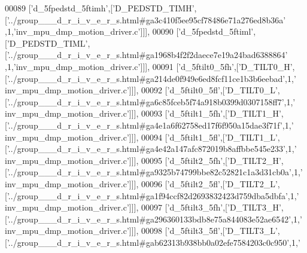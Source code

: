 \begin{DoxyCode}
00089   [\textcolor{stringliteral}{'d\_5fpedstd\_5ftimh'},[\textcolor{stringliteral}{'D\_PEDSTD\_TIMH'},[\textcolor{stringliteral}{'../group\_\_\_d\_r\_i\_v\_e\_r\_s.html#ga3c410f5ee95cf78486e71a276ed8b36a'}
      ,1,\textcolor{stringliteral}{'inv\_mpu\_dmp\_motion\_driver.c'}]]],
00090   [\textcolor{stringliteral}{'d\_5fpedstd\_5ftiml'},[\textcolor{stringliteral}{'D\_PEDSTD\_TIML'},[\textcolor{stringliteral}{'../group\_\_\_d\_r\_i\_v\_e\_r\_s.html#ga1968b4f2f2daece7e19a24bad6388864'}
      ,1,\textcolor{stringliteral}{'inv\_mpu\_dmp\_motion\_driver.c'}]]],
00091   [\textcolor{stringliteral}{'d\_5ftilt0\_5fh'},[\textcolor{stringliteral}{'D\_TILT0\_H'},[\textcolor{stringliteral}{'../group\_\_\_d\_r\_i\_v\_e\_r\_s.html#ga214de0f949e6ed8fcf11ce1b3b6eebad'},1,\textcolor{stringliteral}{'
      inv\_mpu\_dmp\_motion\_driver.c'}]]],
00092   [\textcolor{stringliteral}{'d\_5ftilt0\_5fl'},[\textcolor{stringliteral}{'D\_TILT0\_L'},[\textcolor{stringliteral}{'../group\_\_\_d\_r\_i\_v\_e\_r\_s.html#ga6c85fceb5f74a918b0399d0307158ff7'},1,\textcolor{stringliteral}{'
      inv\_mpu\_dmp\_motion\_driver.c'}]]],
00093   [\textcolor{stringliteral}{'d\_5ftilt1\_5fh'},[\textcolor{stringliteral}{'D\_TILT1\_H'},[\textcolor{stringliteral}{'../group\_\_\_d\_r\_i\_v\_e\_r\_s.html#ga4e1a6f62758ed17f6f950a15dae3f71f'},1,\textcolor{stringliteral}{'
      inv\_mpu\_dmp\_motion\_driver.c'}]]],
00094   [\textcolor{stringliteral}{'d\_5ftilt1\_5fl'},[\textcolor{stringliteral}{'D\_TILT1\_L'},[\textcolor{stringliteral}{'../group\_\_\_d\_r\_i\_v\_e\_r\_s.html#ga4e42a147afc872019b8affbbe545e233'},1,\textcolor{stringliteral}{'
      inv\_mpu\_dmp\_motion\_driver.c'}]]],
00095   [\textcolor{stringliteral}{'d\_5ftilt2\_5fh'},[\textcolor{stringliteral}{'D\_TILT2\_H'},[\textcolor{stringliteral}{'../group\_\_\_d\_r\_i\_v\_e\_r\_s.html#ga9325b74799bbe82c52821c1a3d31cb0a'},1,\textcolor{stringliteral}{'
      inv\_mpu\_dmp\_motion\_driver.c'}]]],
00096   [\textcolor{stringliteral}{'d\_5ftilt2\_5fl'},[\textcolor{stringliteral}{'D\_TILT2\_L'},[\textcolor{stringliteral}{'../group\_\_\_d\_r\_i\_v\_e\_r\_s.html#ga1f94ccf82d2693832423d759dba5dbfa'},1,\textcolor{stringliteral}{'
      inv\_mpu\_dmp\_motion\_driver.c'}]]],
00097   [\textcolor{stringliteral}{'d\_5ftilt3\_5fh'},[\textcolor{stringliteral}{'D\_TILT3\_H'},[\textcolor{stringliteral}{'../group\_\_\_d\_r\_i\_v\_e\_r\_s.html#ga296360133bdb8e75a844083e52ae6542'},1,\textcolor{stringliteral}{'
      inv\_mpu\_dmp\_motion\_driver.c'}]]],
00098   [\textcolor{stringliteral}{'d\_5ftilt3\_5fl'},[\textcolor{stringliteral}{'D\_TILT3\_L'},[\textcolor{stringliteral}{'../group\_\_\_d\_r\_i\_v\_e\_r\_s.html#gab62313b938bb0a02efe7584203c0c950'},1,\textcolor{stringliteral}{'
}
\end{DoxyCode}

